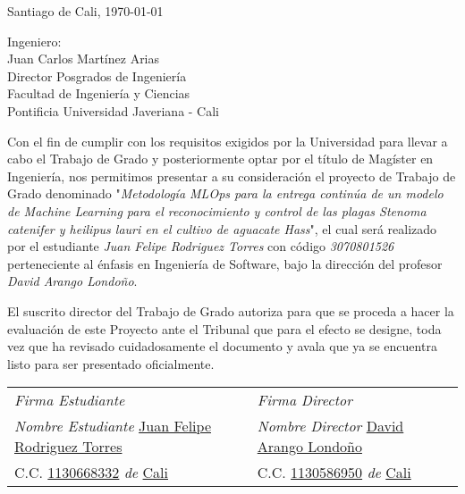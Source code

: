 \thispagestyle{empty}
Santiago de Cali, \today

\newcommand{\underlinetext}[2][1pt]{{%
  \renewcommand{\ULdepth}{#1}%
  \uline{#2}%
}}

\begin{flushleft}
Ingeniero: \\
Juan Carlos Martínez Arias \\
Director Posgrados de Ingeniería \\
Facultad de Ingeniería y Ciencias \\
Pontificia Universidad Javeriana - Cali \\
\end{flushleft}


Con el fin de cumplir con los requisitos exigidos por la Universidad para llevar a cabo el Trabajo de Grado y posteriormente optar por el título de Magíster en Ingeniería, nos permitimos presentar a su consideración el proyecto de Trabajo de Grado denominado "\textit{Metodología MLOps para la entrega continúa de un modelo de Machine Learning para el reconocimiento y control de las plagas Stenoma catenifer y heilipus lauri en el cultivo de aguacate Hass}", el cual será realizado por el estudiante \textit{Juan Felipe Rodriguez Torres} con código \textit{3070801526} perteneciente al énfasis en Ingeniería de Software, bajo la dirección del profesor \textit{David Arango Londoño}.

El suscrito director del Trabajo de Grado autoriza para que se proceda a hacer la evaluación de este Proyecto ante el Tribunal que para el efecto se designe, toda vez que ha revisado cuidadosamente el documento y avala que ya se encuentra listo para ser presentado oficialmente.

\vspace{1cm}

\begin{table}[h]
\begin{tabular}{@{}p{} p{}@{}}
\textit{Firma Estudiante} \hrulefill & \textit{Firma Director} \hrulefill \\
\textit{Nombre Estudiante} \underlinetext[1pt]{Juan Felipe Rodriguez Torres} & \textit{Nombre Director} \underline{David Arango Londoño} \\
C.C. \underline{1130668332} \textit{de} \underline{Cali} & C.C. \underline{1130586950} \textit{de} \underline{Cali} \\
\end{tabular}
\end{table}

\vspace{1cm}
